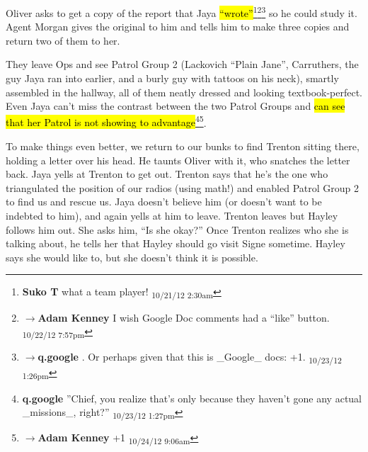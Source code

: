 Oliver asks to get a copy of the report that Jaya \hl{``wrote''}\footnote{\textbf{Suko T }what a team player! \textsubscript{10/21/12 2:30am}}\footnote{$\rightarrow$\textbf{Adam Kenney }I wish Google Doc comments had a ``like'' button. \textsubscript{10/22/12 7:57pm}}\footnote{$\rightarrow$\textbf{q.google }.  Or perhaps given that this is \_Google\_ docs: +1. \textsubscript{10/23/12 1:26pm}} so he could study it.  Agent Morgan gives the original to him and tells him to make three copies and return two of them to her.



They leave Ops and see Patrol Group 2 (Lackovich ``Plain Jane'', Carruthers, the guy Jaya ran into earlier, and a burly guy with tattoos on his neck), smartly assembled in the hallway, all of them neatly dressed and looking textbook-perfect.  Even Jaya can't miss the contrast between the two Patrol Groups and \hl{can see that her Patrol is not showing to advantage}\footnote{\textbf{q.google }''Chief, you realize that's only because they haven't gone any actual \_missions\_, right?'' \textsubscript{10/23/12 1:27pm}}\footnote{$\rightarrow$\textbf{Adam Kenney }+1 \textsubscript{10/24/12 9:06am}}.  



To make things even better, we return to our bunks to find Trenton sitting there, holding a letter over his head.  He taunts Oliver with it, who snatches the letter back.  Jaya yells at Trenton to get out.  Trenton says that he's the one who triangulated the position of our radios (using math!) and enabled Patrol Group 2 to find us and rescue us.  Jaya doesn't believe him (or doesn't want to be indebted to him), and again yells at him to leave.  Trenton leaves but Hayley follows him out.  She asks him, ``Is she okay?''  Once Trenton realizes who she is talking about, he tells her that Hayley should go visit Signe sometime.  Hayley says she would like to, but she doesn't think it is possible. 



